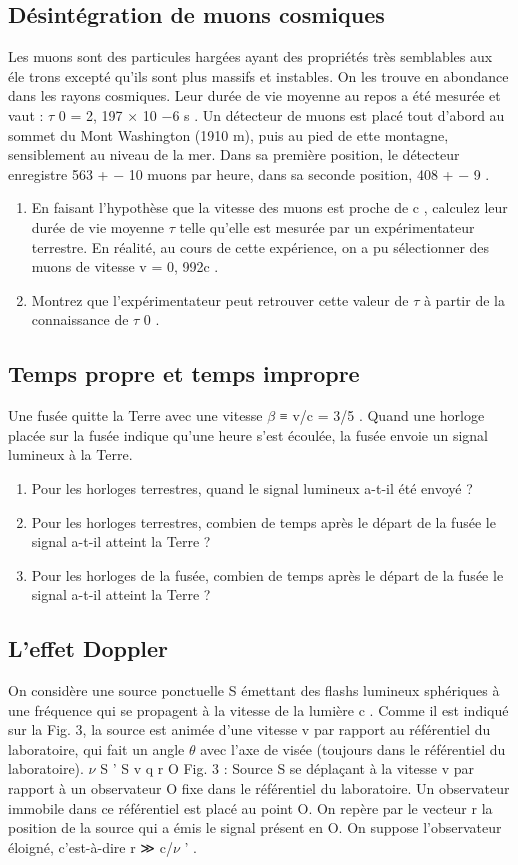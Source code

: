 \subsection{Désintégration de muons cosmiques}
Les muons sont des particules hargées ayant des propriétés très semblables aux éle trons excepté qu'ils sont plus massifs et instables. On les trouve en abondance dans les rayons cosmiques.
Leur durée de vie moyenne au repos a été mesurée et vaut : $\tau$ 0 = 2, 197 × 10 −6 s .
Un détecteur de muons est placé tout d'abord au sommet du Mont Washington (1910 m), puis
au pied de ette montagne, sensiblement au niveau de la mer. Dans sa première position, le
détecteur enregistre 563 +
− 10 muons par heure, dans sa seconde position, 408 +
− 9 .
\begin{enumerate}
  \item En faisant l'hypothèse que la vitesse des muons est proche de c , calculez leur durée de vie
moyenne $\tau$ telle qu'elle est mesurée par un expérimentateur terrestre.
En réalité, au cours de cette expérience, on a pu sélectionner des muons de vitesse v = 0, 992c .
  \item Montrez que l'expérimentateur peut retrouver cette valeur de $\tau$ à partir de la connaissance
de $\tau$ 0 .
\end{enumerate}
\subsection{Temps propre et temps impropre}
Une fusée quitte la Terre avec une vitesse $\beta$ ≡ v/c = 3/5 . Quand une horloge placée sur la
fusée indique qu'une heure s'est écoulée, la fusée envoie un signal lumineux à la Terre.
\begin{enumerate}
  \item Pour les horloges terrestres, quand le signal lumineux a-t-il été envoyé ?
  \item Pour les horloges terrestres, combien de temps après le départ de la fusée le signal a-t-il
atteint la Terre ?
  \item Pour les horloges de la fusée, combien de temps après le départ de la fusée le signal a-t-il
atteint la Terre ?
\end{enumerate}
\subsection{L'effet Doppler}
On considère une source ponctuelle S émettant des flashs lumineux sphériques à une fréquence
qui se propagent à la vitesse de la lumière c . Comme il est indiqué sur la Fig. 3, la source est
animée d'une vitesse v par rapport au référentiel du laboratoire, qui fait un angle $\theta$ avec l'axe
de visée (toujours dans le référentiel du laboratoire).
$\nu$ S '
S
v
q
r
O
Fig. 3 : Source S se déplaçant à la vitesse v par rapport à un observateur O fixe dans le référentiel
du laboratoire.
Un observateur immobile dans ce référentiel est placé au point O. On repère par le vecteur
r la position de la source qui a émis le signal présent en O. On suppose l'observateur éloigné,
c'est-à-dire r ≫ c/$\nu$ ' .
